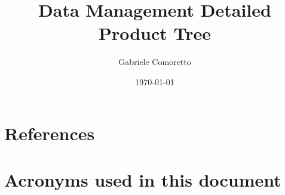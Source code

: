 \documentclass[DM,lsstdraft,authoryear,toc]{lsstdoc}
\title{Data Management Detailed Product Tree}
\author{%
Gabriele Comoretto
}
\date{\today}
\begin{document}
\providecommand{\tightlist}{%
  \setlength{\itemsep}{0pt}\setlength{\parskip}{0pt}}


\maketitle




\newpage
\appendix
\section{References} \label{sec:bib}


\section{Acronyms used in this document}\label{sec:acronyms}

\end{document}
